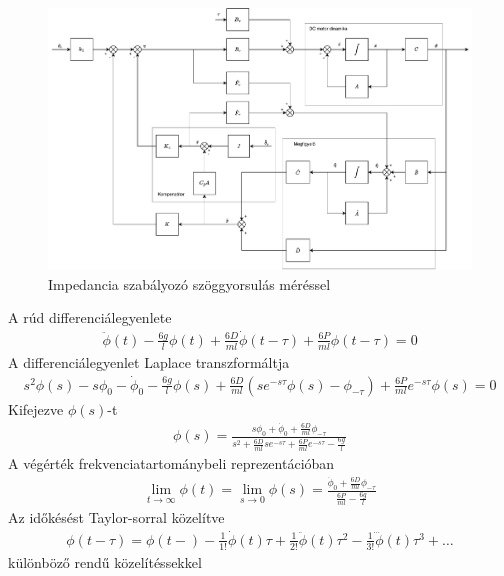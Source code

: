 \begin{figure}[ht]
\begin{center}
\includegraphics[width=\textwidth]{images/compensated_position_controller_angular_acceleration.pdf}
\caption{Impedancia szabályozó szöggyorsulás méréssel}
\end{center}
\end{figure}

\pagebreak
A rúd differenciálegyenlete
\begin{align}
    \ddot\phi\left(t\right) - \frac{6g}{l}\phi\left(t\right) + 
    \frac{6D}{ml}\dot\phi\left(t-\tau\right) + \frac{6P}{ml}\phi\left(t-\tau\right) = 0
\end{align}
A differenciálegyenlet Laplace transzformáltja
\begin{align}
    s^2\phi\left(s\right) - s\phi_0 - \dot\phi_0 - 
    \frac{6g}{l}\phi\left(s\right) + 
    \frac{6D}{ml}\left(se^{-s\tau}\phi\left(s\right)-\phi_{-\tau}\right) + 
    \frac{6P}{ml}e^{-s\tau}\phi\left(s\right) = 0 
\end{align}
Kifejezve $\phi\left(s\right)$-t
\begin{align}
    \phi\left(s\right) = \frac{s\phi_0+\dot\phi_0+\frac{6D}{ml}\phi_{-\tau}}{s^2+\frac{6D}{ml}se^{-s\tau}+\frac{6P}{ml}e^{-s\tau}-\frac{6g}{l}}
\end{align}
A végérték frekvenciatartománybeli reprezentációban
\begin{align}
    \lim_{t \to \infty}\phi\left(t\right) = 
    \lim_{s \to 0} \phi\left(s\right) = 
    \frac{\dot\phi_0+\frac{6D}{ml}\phi_{-\tau}}{\frac{6P}{ml}-\frac{6g}{l}}
\end{align}
Az időkésést Taylor-sorral közelítve
\begin{align}
    \phi\left(t-\tau\right) = \phi\left(t-\right) - 
    \frac{1}{1!}\dot\phi\left(t\right)\tau + 
    \frac{1}{2!}\ddot\phi\left(t\right)\tau^2 - 
    \frac{1}{3!}\dddot\phi\left(t\right)\tau^3 + \ldots
\end{align}
különböző rendű közelítéssekkel

